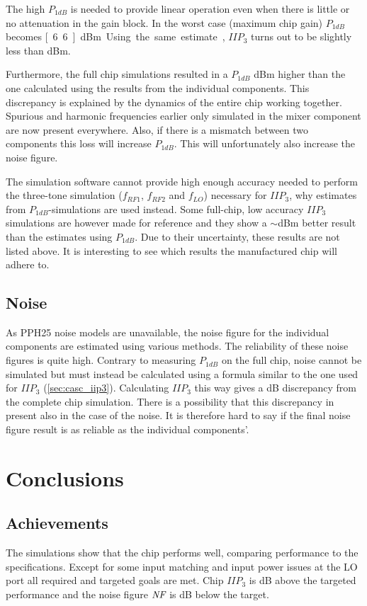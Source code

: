 			The high $P_{1dB}$ is needed to provide linear operation even when there is little or no attenuation in the gain block. In the worst case (maximum chip gain) $P_{1dB}$ becomes \unit[6.6]{dBm}. Using the same estimate, $IIP_3$ turns out to be slightly less than \unit[17]{dBm}.
			
			Furthermore, the full chip simulations resulted in a $P_{1dB}$ \unit[2]{dBm} higher than the one calculated using the results from the individual components. This discrepancy is explained by the dynamics of the entire chip working together. Spurious and harmonic frequencies earlier only simulated in the mixer component are now present everywhere. Also, if there is a mismatch between two components this loss will increase $P_{1dB}$. This will unfortunately also increase the noise figure.
			
			The simulation software cannot provide high enough accuracy needed to perform the three-tone simulation ($f_{RF1}$, $f_{RF2}$ and $f_{LO}$) necessary for $IIP_3$, why estimates from $P_{1dB}$-simulations are used instead. Some full-chip, low accuracy $IIP_3$ simulations are however made for reference and they show a $\sim$\unit[3]{dBm} better result than the estimates using $P_{1dB}$. Due to their uncertainty, these results are not listed above. It is interesting to see which results the manufactured chip will adhere to.
			
		\subsection{Noise}
			As PPH25 noise models are unavailable, the noise figure for the individual components are estimated using various methods. The reliability of these noise figures is quite high. Contrary to measuring $P_{1dB}$ on the full chip, noise cannot be simulated but must instead be calculated using a formula similar to the one used for $IIP_3$ (\autoref{sec:casc_iip3}). Calculating $IIP_3$ this way gives a \unit[2]{dB} discrepancy from the complete chip simulation. There is a possibility that this discrepancy in present also in the case of the noise. It is therefore hard to say if the final noise figure result is as reliable as the individual components'.
			
	\section{Conclusions}
		\subsection{Achievements}
			The simulations show that the chip performs well, comparing performance to the specifications. Except for some input matching and input power issues at the LO port all required and targeted goals are met. Chip $IIP_3$ is \unit[3]{dB} above the targeted performance and the noise figure $\emph{NF}$ is \unit[1]{dB} below the target.
						
